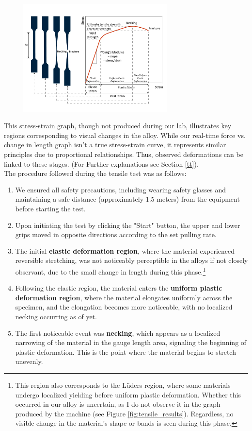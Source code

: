 \documentclass{article}
\begin{document}
\begin{figure}[H]
    \centering    
    \includegraphics[width=0.7\textwidth]{images/simwiki-stress-strain-shape-evolution.png}
    \label{fig:alloys_next_graph}
\end{figure}
This stress-strain graph, though not produced during our lab, illustrates key regions corresponding to visual changes in the alloy. While our real-time force vs. change in length graph isn't a true stress-strain curve, it represents similar principles due to proportional relationships. Thus, observed deformations can be linked to these stages. (For Further explanations see Section \ref{tt}).\\[8pt]
The procedure followed during the tensile test was as follows: 
\begin{enumerate}
    \item We ensured all safety precautions, including wearing safety glasses and maintaining a safe distance (approximately 1.5 meters) from the equipment before starting the test.
    \item Upon initiating the test by clicking the "Start" button, the upper and lower grips moved in opposite directions according to the set pulling rate.
    \item The initial \textbf{elastic deformation region}, where the material experienced reversible stretching, was not noticeably perceptible in the alloys if not closely observant, due to the small change in length during this phase.\footnote{This region also corresponds to the Lüders region, where some materials undergo localized yielding before uniform plastic deformation. Whether this occurred in our alloy is uncertain, as I do not observe it in the graph produced by the machine (see Figure \ref{fig:tensile_results}). Regardless, no visible change in the material's shape or bands is seen during this phase.}
    \item Following the elastic region, the material enters the \textbf{uniform plastic deformation region}, where the material elongates uniformly across the specimen, and the elongation becomes more noticeable, with no localized necking occurring as of yet.
    \item The first noticeable event was \textbf{necking}, which appears as a localized narrowing of the material in the gauge length area, signaling the beginning of plastic deformation. This is the point where the material begins to stretch unevenly.
\end{enumerate}
\end{document}
